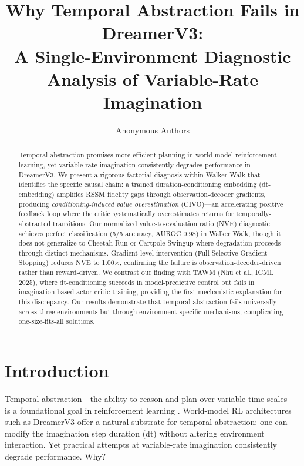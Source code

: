 \documentclass[10pt,letterpaper]{article}
\title{Why Temporal Abstraction Fails in DreamerV3: \\A Single-Environment Diagnostic Analysis of Variable-Rate Imagination}
\author{Anonymous Authors}
\date{}
\begin{document}
\maketitle

\begin{abstract}
Temporal abstraction promises more efficient planning in world-model reinforcement learning, yet variable-rate imagination consistently degrades performance in DreamerV3. We present a rigorous factorial diagnosis within Walker Walk that identifies the specific causal chain: a trained duration-conditioning embedding (dt-embedding) amplifies RSSM fidelity gaps through observation-decoder gradients, producing \emph{conditioning-induced value overestimation} (CIVO)---an accelerating positive feedback loop where the critic systematically overestimates returns for temporally-abstracted transitions. Our normalized value-to-evaluation ratio (NVE) diagnostic achieves perfect classification (5/5 accuracy, AUROC 0.98) in Walker Walk, though it does not generalize to Cheetah Run or Cartpole Swingup where degradation proceeds through distinct mechanisms. Gradient-level intervention (Full Selective Gradient Stopping) reduces NVE to 1.00$\times$, confirming the failure is observation-decoder-driven rather than reward-driven. We contrast our finding with TAWM (Nhu et al., ICML 2025), where dt-conditioning succeeds in model-predictive control but fails in imagination-based actor-critic training, providing the first mechanistic explanation for this discrepancy. Our results demonstrate that temporal abstraction fails universally across three environments but through environment-specific mechanisms, complicating one-size-fits-all solutions.
\end{abstract}

\section{Introduction}

Temporal abstraction---the ability to reason and plan over variable time scales---is a foundational goal in reinforcement learning \cite{sutton1999options,vezhnevets2017feudal}. World-model RL architectures such as DreamerV3 \cite{hafner2023dreamerv3} offer a natural substrate for temporal abstraction: one can modify the imagination step duration (dt) without altering environment interaction. Yet practical attempts at variable-rate imagination consistently degrade performance. Why?
\end{document}
